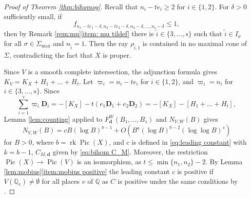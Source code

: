\documentclass[10pt, a4paper, reqno, english]{amsart}
\newcommand\QQ{\mathbb{Q}}
\newcommand{\divclass}{{\mathbf D}} %
\DeclareMathOperator{\pic}{Pic} %
\DeclareMathOperator{\rk}{rk} %
\theoremstyle{definition}
\numberwithin{theorem}{section}
\numberwithin{equation}{section}
\begin{document}
\begin{proof}[Proof of Theorem \ref{thm:bihomog}]
	 Recall that $n_i - te_i\geq 2$ for $i\in\{1,2\}$. For $\delta>0$ sufficiently small, if $$f_{n_1-te_1-\delta, n_2-te_2-\delta, n_3-\delta,\dots,n_s-\delta}\leq 1,$$ then by Remark \ref{rem:mu}\ref{item: mu tildef} there is $\tilde i\in\{3,\dots,s\}$ such that $\tilde i\in I_\sigma$ for all $\sigma\in\Sigma_{\max}$ and $n_{\tilde i}=1$. Then the ray $\rho_{\tilde i,1}$ is contained in no  maximal cone of $\Sigma$, contradicting the fact that $X$ is proper. 
	 
	Since $V$ is a smooth complete intersection, the adjunction formula \cite[Proposition 16.4]{MR1225842}  gives $K_V=K_X+H_1+\dots+H_t$.	 
	Let $\varpi_i=n_i-te_i$ for $i\in\{1,2\}$, and $\varpi_i=n_i$ for $i\in\{3,\dots,s\}$.
	 Since \begin{equation*}
	\sum_{i=1}^s\varpi_i\divclass_i=-[K_X]-t(e_1\divclass_1+e_2\divclass_2)=-[K_X]-[H_1+\dots+H_t],
	\end{equation*}
	Lemma \ref{lem:counting}  applied to $F^W_{\mathbf d}(B_1,\dots,B_s)$ and $N_{V,W}(B)$ gives 
	$$
N_{V,W}(B)=cB(\log B)^{b-1} +O(B^a(\log B)^{b-2}(\log\log B)^s)
$$
for $B>0$, where $b=\rk\pic(X)$, and $c$ is defined in \eqref{eq:leading constant} with $k=b-1$,  $C_{M,\mathbf d}$ given by \eqref{eq:bihom C_M}.
Moreover, the restriction $\pic(X)\to\pic(V)$ is an isomorphism, as $t\leq\min\{n_1,n_2\}-2$. By Lemma \ref{lem:mobius}\ref{item:mobius positive} the leading constant $c$ is positive if $V(\QQ_v)\neq\emptyset$ for all places $v$ of $\QQ$ as $C$ is positive under the same conditions by \cite[Theorems 4.3 and 4.4]{Sch}.
\end{proof}
\end{document}
